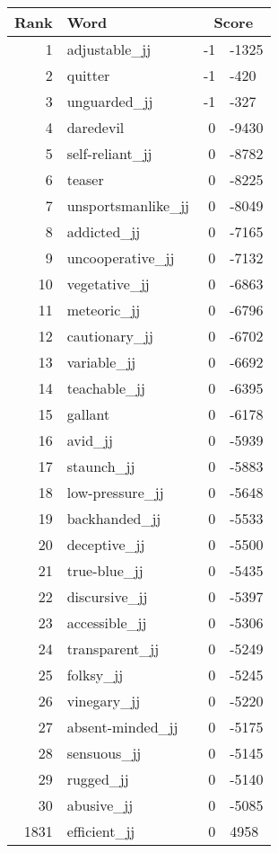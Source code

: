 \begin{longtable}[!htbp]{| rlr@{.}l |}
    \hline
    \textbf{Rank} & \textbf{Word} & \multicolumn{2}{c|}{\textbf{Score}} \\
    \hline
    \endhead
    1 & adjustable\_jj & -1 & -1325 \\
    2 & quitter & -1 & -420 \\
    3 & unguarded\_jj & -1 & -327 \\
    4 & daredevil & 0 & -9430 \\
    5 & self-reliant\_jj & 0 & -8782 \\
    6 & teaser & 0 & -8225 \\
    7 & unsportsmanlike\_jj & 0 & -8049 \\
    8 & addicted\_jj & 0 & -7165 \\
    9 & uncooperative\_jj & 0 & -7132 \\
    10 & vegetative\_jj & 0 & -6863 \\
    11 & meteoric\_jj & 0 & -6796 \\
    12 & cautionary\_jj & 0 & -6702 \\
    13 & variable\_jj & 0 & -6692 \\
    14 & teachable\_jj & 0 & -6395 \\
    15 & gallant & 0 & -6178 \\
    16 & avid\_jj & 0 & -5939 \\
    17 & staunch\_jj & 0 & -5883 \\
    18 & low-pressure\_jj & 0 & -5648 \\
    19 & backhanded\_jj & 0 & -5533 \\
    20 & deceptive\_jj & 0 & -5500 \\
    21 & true-blue\_jj & 0 & -5435 \\
    22 & discursive\_jj & 0 & -5397 \\
    23 & accessible\_jj & 0 & -5306 \\
    24 & transparent\_jj & 0 & -5249 \\
    25 & folksy\_jj & 0 & -5245 \\
    26 & vinegary\_jj & 0 & -5220 \\
    27 & absent-minded\_jj & 0 & -5175 \\
    28 & sensuous\_jj & 0 & -5145 \\
    29 & rugged\_jj & 0 & -5140 \\
    30 & abusive\_jj & 0 & -5085 \\
    1831 & efficient\_jj & 0 & 4958 \\

\end{longtable}
